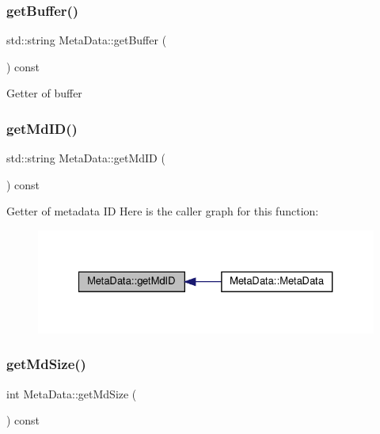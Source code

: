 \subsubsection{\texorpdfstring{get\+Buffer()}{getBuffer()}}
{\footnotesize\ttfamily std\+::string Meta\+Data\+::get\+Buffer (\begin{DoxyParamCaption}{ }\end{DoxyParamCaption}) const}

Getter of buffer \mbox{\label{classMetaData_ad46cdaa2d7d988b9f73cd3c438dd9cb9}} 
\subsubsection{\texorpdfstring{get\+Md\+I\+D()}{getMdID()}}
{\footnotesize\ttfamily std\+::string Meta\+Data\+::get\+Md\+ID (\begin{DoxyParamCaption}{ }\end{DoxyParamCaption}) const}

Getter of metadata ID Here is the caller graph for this function\+:\nopagebreak
\begin{figure}[H]
\begin{center}
\leavevmode
\includegraphics[width=327pt]{classMetaData_ad46cdaa2d7d988b9f73cd3c438dd9cb9_icgraph}
\end{center}
\end{figure}
\mbox{\label{classMetaData_ab013c35f16c09bc6e69164c2c6df5b46}} 
\subsubsection{\texorpdfstring{get\+Md\+Size()}{getMdSize()}}
{\footnotesize\ttfamily int Meta\+Data\+::get\+Md\+Size (\begin{DoxyParamCaption}{ }\end{DoxyParamCaption}) const}

